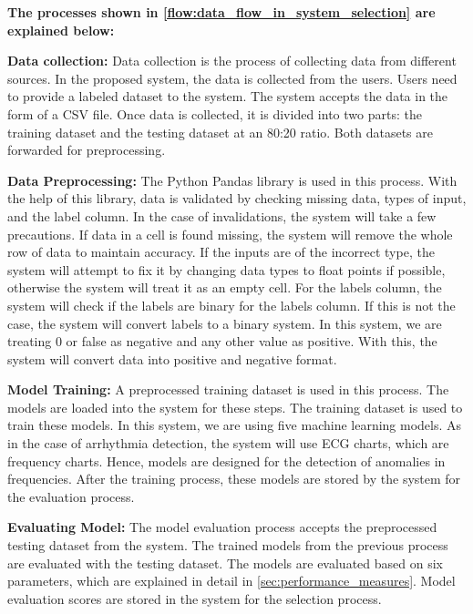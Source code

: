 \textbf{The processes shown in \cref{flow:data_flow_in_system_selection} are explained below:}

\vspace{-0.5em}
\textbf{Data collection:}
Data collection is the process of collecting data from different sources. In the proposed system, the data is collected from the users. Users need to provide a labeled dataset to the system. The system accepts the data in the form of a CSV file. Once data is collected, it is divided into two parts: the training dataset and the testing dataset at an 80:20 ratio. Both datasets are forwarded for preprocessing.

\vspace{-0.5em}
\textbf{Data Preprocessing:}
The Python Pandas library is used in this process. With the help of this library, data is validated by checking missing data, types of input, and the label column. In the case of invalidations, the system will take a few precautions. If data in a cell is found missing, the system will remove the whole row of data to maintain accuracy. If the inputs are of the incorrect type, the system will attempt to fix it by changing data types to float points if possible, otherwise the system will treat it as an empty cell. For the labels column, the system will check if the labels are binary for the labels column. If this is not the case, the system will convert labels to a binary system. In this system, we are treating 0 or false as negative and any other value as positive. With this, the system will convert data into positive and negative format.

\vspace{-0.5em}
\textbf{Model Training:}
A preprocessed training dataset is used in this process. The models are loaded into the system for these steps. The training dataset is used to train these models. In this system, we are using five machine learning models. As in the case of arrhythmia detection, the system will use ECG charts, which are frequency charts. Hence, models are designed for the detection of anomalies in frequencies. After the training process, these models are stored by the system for the evaluation process.

\vspace{-0.5em}
\textbf{Evaluating Model:}
The model evaluation process accepts the preprocessed testing dataset from the system. The trained models from the previous process are evaluated with the testing dataset. The models are evaluated based on six parameters, which are explained in detail in \cref{sec:performance_measures}. Model evaluation scores are stored in the system for the selection process.

